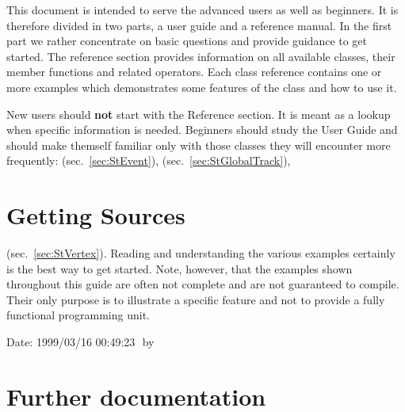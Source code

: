 This document is intended to serve the advanced users as well as
beginners. It is therefore divided in two parts, a user guide and a
reference manual. In the first part we rather concentrate on basic
questions and provide guidance to get started.  The reference section
provides information on all available classes, their member functions
and related operators. Each class reference contains one or more
examples which demonstrates some features of the class and how to use
it.

New users should \textbf{not} start with the Reference section. It is
meant as a lookup when specific information is needed. Beginners
should study the User Guide and should make themself familiar only
with those classes they will encounter more frequently: 
(sec.~\ref{sec:StEvent}), 
(sec.~\ref{sec:StGlobalTrack}), 
\section{Getting \StEvent Sources}  
(sec.~\ref{sec:StVertex}).  Reading and understanding the various
examples certainly is the best way to get started. Note, however, that
the examples shown throughout this guide are often not complete and
are not guaranteed to compile. Their only purpose is to illustrate a
specific feature and not to provide a fully functional programming
unit.

  {\LARGE $ $Date: 1999/03/16 00:49:23 $ $}  %
     \advance\leftmargin by %
\section{Further documentation}
\label{sec:furtherdoc}

